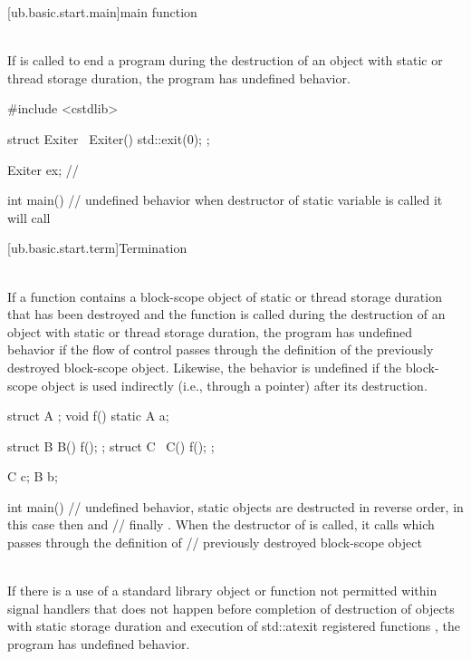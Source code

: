 {[ub.basic.start.main]{main function}

\pnum
{} \\
If  is called to
end a program during the destruction of an object with static or thread storage duration, the program has
undefined behavior.

\pnum
\begin{example}
\begin{codeblock}
#include <cstdlib>

struct Exiter {
  ~Exiter() { std::exit(0); }
};

Exiter ex;  //

int main() {}
// undefined behavior when destructor of static variable  is called it will call 
\end{codeblock}
\end{example}


[ub.basic.start.term]{Termination}

\pnum
{} \\
If a function contains a block-scope object of static or thread storage duration that has been destroyed and the
function is called during the destruction of an object with static or thread storage duration, the program has
undefined behavior if the flow of control passes through the definition of the previously destroyed block-scope
object. Likewise, the behavior is undefined if the block-scope object is used indirectly (i.e., through a pointer)
after its destruction.

\pnum
\begin{example}
\begin{codeblock}
struct A {};
void f() {
  static A a;
}

struct B {
  B() { f(); }
};
struct C {
  ~C() { f(); }
};

C c;
B b;

int main() {}
// undefined behavior, static objects are destructed in reverse order, in this case  then  and
// finally . When the destructor of  is called, it calls  which passes through the definition of
// previously destroyed block-scope object
\end{codeblock}
\end{example}


\pnum
{} \\
If there is a use of a standard library object or function not permitted within signal handlers  that
does not happen before  completion of destruction of objects with static storage duration and execution
of std::atexit registered functions , the program has undefined behavior.

}
